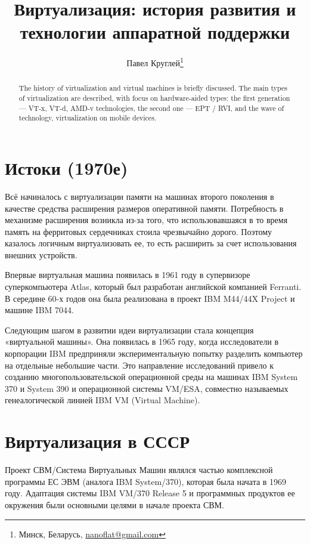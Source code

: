 \documentclass[10pt, a5paper]{article}
\begin{document}
\title{Виртуализация: история развития и технологии аппаратной поддержки}
\author{Павел Круглей\footnote{Минск, Беларусь, \url{nanoflat@gmail.com}}}
\date{}
\maketitle

\begin{abstract}
The history of virtualization and virtual machines is briefly discussed. The main types of virtualization are described, with focus on hardware-aided types: the first generation --- VT-x, VT-d, AMD-v technologies, the second one --- EPT / RVI, and the wave of technology, virtualization on mobile devices.\end{abstract}

\section*{Истоки (1970е)}
Всё начиналось с виртуализации памяти на машинах второго поколения в качестве средства расширения размеров оперативной памяти. Потребность в механизме расширения возникла из-за того, что использовавшаяся в то время память на ферритовых сердечниках стоила чрезвычайно дорого. Поэтому казалось логичным виртуализовать ее, то есть расширить за счет использования внешних устройств.

Впервые виртуальная машина появилась в 1961 году в супервизоре суперкомпьютера Atlas, который был разработан английской компанией Ferranti. В середине 60-х годов она была реализована в проект IBM M44/44X Project и машине IBM 7044. 

Следующим шагом в развитии идеи виртуализации стала концепция «виртуальной машины». Она появилась в 1965 году, когда исследователи в корпорации IBM предприняли экспериментальную попытку разделить компьютер на отдельные небольшие части. Это направление исследований привело к созданию многопользовательской операционной среды на машинах IBM System 370 и System 390 и операционной системы VM/ESA, совместно называемых генеалогической линией IBM VM (Virtual Machine). 

\section*{Виртуализация в СССР}

Проект СВМ/Система Виртуальных Машин являлся частью комплексной программы ЕС ЭВМ (аналога IBM System/370), которая была начата в 1969 году. Адаптация системы IBM VM/370 Release 5 и программных продуктов ее окружения были основными целями в начале проекта СВМ.
\end{document}
